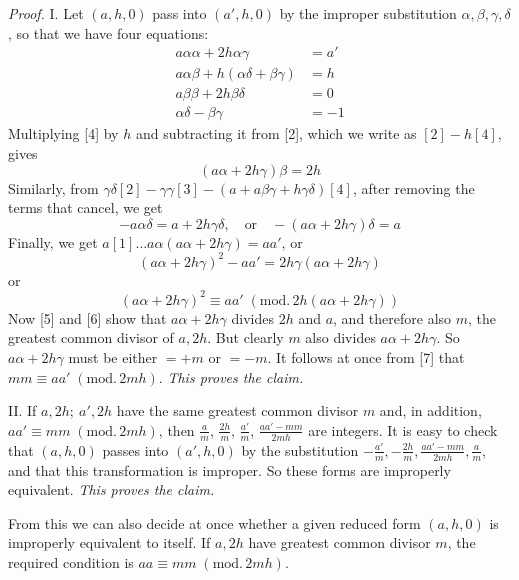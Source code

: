 \textit{Proof.} I. Let $(a,h,0)$ pass into $(a',h,0)$ by the improper substitution $\alpha,\beta,\gamma,\delta$, so that we have four equations:
\begin{align*}
a\alpha\alpha+2h\alpha\gamma&=a'\tag*{. . . . . . . . . . . . [1]}\\
a\alpha\beta+h(\alpha\delta+\beta\gamma)&=h\tag*{. . . . . . . . . . [2]}\\
a\beta\beta+2h\beta\delta&=0\tag*{. . . . . . . . . . . . [3]}\\
\alpha\delta-\beta\gamma&=-1\tag*{. . . . . . . . . . . . . [4]}
\end{align*}
Multiplying [4] by $h$ and subtracting it from [2], which we write as $[2]-h[4]$, gives
\begin{equation*}
(a\alpha+2h\gamma)\beta=2h\tag*{. . . . . . . . . . . . [5]}
\end{equation*}
Similarly, from $\gamma\delta[2]-\gamma\gamma[3]-(a+a\beta\gamma+h\gamma\delta)[4]$, after removing the terms that cancel, we get
\begin{equation*}
-a\alpha\delta=a+2h\gamma\delta,\quad\text{or}\quad -(a\alpha+2h\gamma)\delta=a\tag*{. . [6]}
\end{equation*}
Finally, we get $a[1]\ldots a\alpha(a\alpha+2h\gamma)=aa'$, or
\[
(a\alpha+2h\gamma)^2-aa'=2h\gamma(a\alpha+2h\gamma)
\]
or
\begin{equation*}
(a\alpha+2h\gamma)^2\equiv aa'\;(\mathrm{mod.}\,2h(a\alpha+2h\gamma))\tag*{. . . . . [7]}
\end{equation*}
Now [5] and [6] show that $a\alpha+2h\gamma$ divides $2h$ and $a$, and therefore also $m$, the greatest common divisor of $a,2h$. But clearly $m$ also divides $a\alpha+2h\gamma$. So $a\alpha+2h\gamma$ must be either $=+m$ or $=-m$. It follows at once from [7] that $mm\equiv aa'\;(\mathrm{mod.}\,2mh)$. \textit{This proves the claim.}

II. If $a,2h;\ a',2h$ have the same greatest common divisor $m$ and, in addition, $aa'\equiv mm\;(\mathrm{mod.}\,2mh)$, then $\frac a m$, $\frac{2h}{m}$, $\frac{a'}{m}$, $\frac{aa'-mm}{2mh}$ are integers. It is easy to check that $(a,h,0)$ passes into $(a',h,0)$ by the substitution $-\frac{a'}{m},-\frac{2h}{m},\frac{aa'-mm}{2mh},\frac a m$, and that this transformation is improper. So these forms are improperly equivalent. \textit{This proves the claim.}

From this we can also decide at once whether a given reduced form $(a,h,0)$ is improperly equivalent to itself. If $a,2h$ have greatest common divisor $m$, the required condition is $aa\equiv mm\;(\mathrm{mod.}\,2mh)$.

